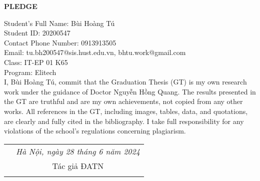 \documentclass[../DoAn.tex]{subfiles}
\begin{document}
\hfill
\begin{center}
    \LARGE\textbf{PLEDGE}\\
\end{center}
\vspace{1cm}
Student's Full Name: Bùi Hoàng Tú\\
Student ID: 20200547\\
Contact Phone Number: 0913913505\\ 
Email: tu.bh200547@sis.hust.edu.vn, bhtu.work@gmail.com\\
Class: IT-EP 01 K65\\
Program: Elitech\\

\vspace{1cm}
I, Bùi Hoàng Tú, commit that the Graduation Thesis (GT) is my own research work under the guidance of Doctor Nguyễn Hồng Quang. The results presented in the GT are truthful and are my own achievements, not copied from any other works. All references in the GT, including images, tables, data, and quotations, are clearly and fully cited in the bibliography. I take full responsibility for any violations of the school's regulations concerning plagiarism.

\begin{table}[H]
\centering
\begin{tabular}{p{5cm} c}
\multicolumn{1}{c}{\textbf{}} &\emph{Hà Nội, ngày 28 tháng 6 năm 2024   }\vspace{0.4cm}\\
\textbf{}               & Tác giả ĐATN \vspace{3cm} \\

\textbf{}               & \emph{}
\end{tabular}
\end{table}
\end{document}
